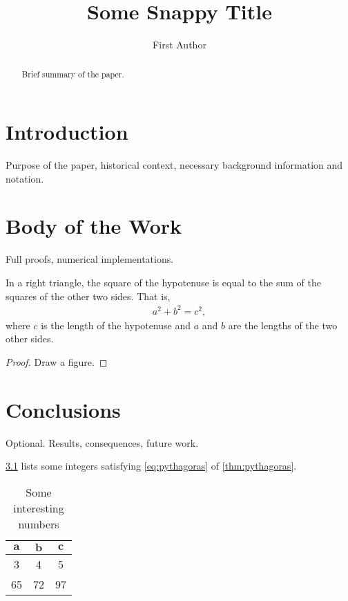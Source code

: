 \documentclass[a4paper, article, oneside, UKenglish]{memoir}
\title{Some Snappy Title}
\author{First Author}
\newcommand{\0}{\mathbf{0}}
\newcommand{\1}{\mathbf{1}}
\begin{document}
\maketitle


\begin{abstract}
    \noindent
    Brief summary of the paper.
\end{abstract}


\chapter{Introduction}


Purpose of the paper, historical context, necessary background information and notation.


\chapter{Body of the Work}


Full proofs, numerical implementations.

\begin{theorem}[Pythagoras]
    \label{thm:pythagoras}
    In a right triangle, the square of the hypotenuse is equal to the sum of the squares of the other two sides. That is,
    \begin{align}
        \label{eq:pythagoras}
            a^2 + b^2 = c^2,
    \end{align}
    where \(c\) is the length of the hypotenuse and \(a\) and \(b\) are the lengths of the two other sides.
\end{theorem}

\begin{proof}
    Draw a figure.
\end{proof}


\chapter{Conclusions}


Optional. Results, consequences, future work.

\cref{tab:numbers} lists some integers satisfying \cref{eq:pythagoras} of \cref{thm:pythagoras}.

\begin{table}[htbp]
    \centering
    \begin{tabular}{@{}ccc@{}}
        \toprule
        \(\boldsymbol{a}\) & \(\boldsymbol{b}\) & \(\boldsymbol{c}\)
        \\
        \midrule
        3 & 4 & 5
        \\
        65 & 72 & 97
        \\
        \bottomrule
    \end{tabular}
    \caption{Some interesting numbers}
    \label{tab:numbers}
\end{table}


\printbibliography
\end{document}
